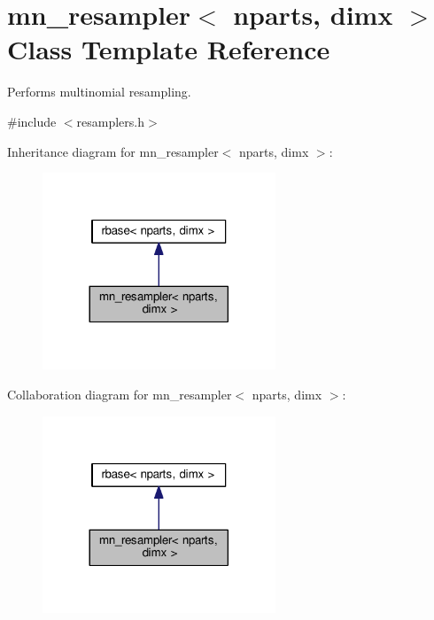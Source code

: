 \hypertarget{classmn__resampler}{}\section{mn\+\_\+resampler$<$ nparts, dimx $>$ Class Template Reference}
\label{classmn__resampler}


Performs multinomial resampling.  




{\ttfamily \#include $<$resamplers.\+h$>$}



Inheritance diagram for mn\+\_\+resampler$<$ nparts, dimx $>$\+:\nopagebreak
\begin{figure}[H]
\begin{center}
\leavevmode
\includegraphics[width=197pt]{classmn__resampler__inherit__graph}
\end{center}
\end{figure}


Collaboration diagram for mn\+\_\+resampler$<$ nparts, dimx $>$\+:\nopagebreak
\begin{figure}[H]
\begin{center}
\leavevmode
\includegraphics[width=197pt]{classmn__resampler__coll__graph}
\end{center}
\end{figure}
